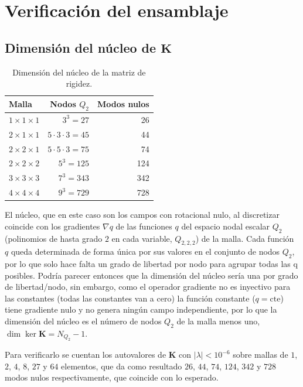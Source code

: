 \documentclass[12pt]{report} %
\begin{document}
\section{Verificación del ensamblaje}\label{sec:res-ensamblaje}
\subsection{Dimensión del núcleo de $\mathbf{K}$}\label{sec:res-nucleo}

\begin{table}[htbp]
	\centering
	\caption{Dimensión del núcleo de la matriz de rigidez.}
	\label{tab:nucleo}
	\begin{tabular}{lrr}
		\toprule
		\textbf{Malla} & \textbf{Nodos $Q_2$} & \textbf{Modos nulos} \\
		\midrule
		$1\times1\times1$ & $3^3 = 27$ & 26 \\
		$2\times1\times1$ & $5\cdot3\cdot3 = 45$ & 44 \\
		$2\times2\times1$ & $5\cdot5\cdot3 = 75$ & 74 \\
		$2\times2\times2$ & $5^3 = 125$ & 124 \\
		$3\times3\times3$ & $7^3 = 343$ & 342 \\
		$4\times4\times4$ & $9^3 = 729$ & 728 \\
		\bottomrule
	\end{tabular}
\end{table}

El núcleo, que en este caso son los campos con rotacional nulo, al discretizar coincide con los gradientes $\nabla q$ de las funciones $q$ del espacio nodal escalar $Q_2$ (polinomios de hasta grado $2$ en cada variable, $Q_{2,2,2}$) de la malla. Cada función $q$ queda determinada de forma única por sus valores en el conjunto de nodos $Q_2$, por lo que solo hace falta un grado de libertad por nodo para agrupar todas las q posibles. Podría parecer entonces que la dimensión del núcleo sería una por grado de libertad/nodo, sin embargo, como el operador gradiente no es inyectivo para las constantes (todas las constantes van a cero) la función constante ($q=\text{cte}$) tiene gradiente nulo y no genera ningún campo independiente, por lo que la dimensión del núcleo es el número de nodos $Q_2$ de la malla menos uno, $\dim\ker\mathbf{K} = N_{Q_2} - 1$.

Para verificarlo se cuentan los autovalores de $\mathbf{K}$ con $|\lambda|<10^{-6}$ sobre mallas de $1$, $2$, $4$, $8$, $27$ y $64$ elementos, que da como resultado $26$, $44$, $74$, $124$, $342$ y $728$ modos nulos respectivamente, que coincide con lo esperado.
\end{document}
